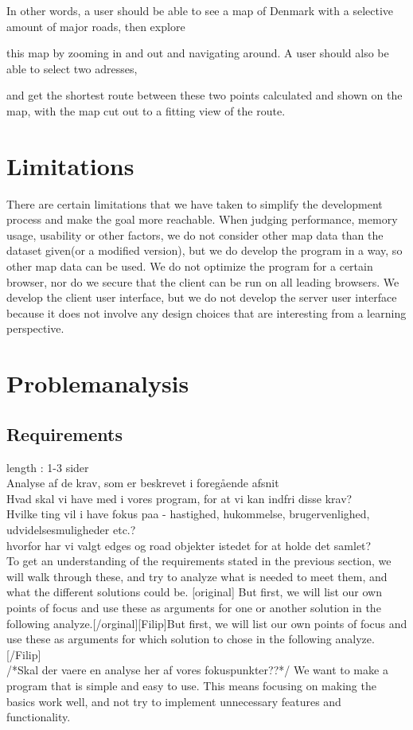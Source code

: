 \documentclass[a4paper,10pt,titlepage]{article}
\begin{document}
		In other words, a user should be able to see a map of Denmark with a selective amount of major roads, then explore

		 this map by zooming in and out and navigating around. A user should also be able to select two adresses,

		 and get the shortest route between these two points calculated and shown on the map, with the map cut out to a
		 fitting view of the route.
		 
	\newpage
	\section{Limitations}
		
		There are certain limitations that we have taken to simplify the development process and make the goal more reachable. When judging performance, memory usage, usability or other factors, we do not consider
		 other map data than the dataset given(or a modified version), but we do develop the program in a way, so other map data can be used. We do not optimize the program for a certain browser, nor do
		 we secure that the client can be run on all leading browsers. We develop the client user interface, but we do not develop the server user interface because it does not involve any design choices that are interesting from a learning perspective.


	\section{Problemanalysis}
		\subsection{Requirements}
		length : 1-3 sider\\
		Analyse af de krav, som er beskrevet i foregående afsnit\\
		Hvad skal vi have med i vores program, for at vi kan indfri disse krav?\\
		Hvilke ting vil i have fokus paa - hastighed, hukommelse, brugervenlighed, udvidelsesmuligheder etc.?\\
		hvorfor har vi valgt edges og road objekter istedet for at holde det samlet?\\
		
 To get an understanding of the requirements stated in the previous section, we will walk through these, and try to         analyze what is needed to meet them, and what the different solutions could be. [original] But first, we will list our own points of focus and use these as arguments for one or another solution in the following analyze.[/orginal][Filip]But first, we will list our own points of focus and use these as arguments for which solution to chose in the following analyze.[/Filip] \\
/*Skal der vaere en analyse her af vores fokuspunkter??*/
 We want to make a program that is simple and easy to use. This means focusing on making the basics work well, and not     try to implement unnecessary features and functionality.\\
\end{document}
